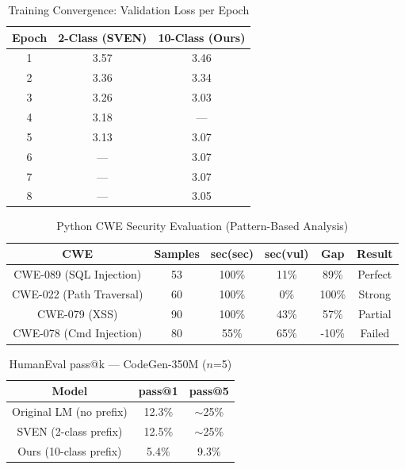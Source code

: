 \begin{table}[h]
\centering
\caption{Training Convergence: Validation Loss per Epoch}
\label{tab:convergence}
\begin{tabular}{c|c|c}
\hline
\textbf{Epoch} & \textbf{2-Class (SVEN)} & \textbf{10-Class (Ours)} \\
\hline
1 & 3.57 & 3.46 \\
2 & 3.36 & 3.34 \\
3 & 3.26 & 3.03 \\
4 & 3.18 & ---   \\
5 & 3.13 & 3.07 \\
6 & ---  & 3.07 \\
7 & ---  & 3.07 \\
8 & ---  & 3.05 \\
\hline
\end{tabular}
\end{table}

\begin{table}[h]
\centering
\caption{Python CWE Security Evaluation (Pattern-Based Analysis)}
\label{tab:python_sec}
\begin{tabular}{c|c|c|c|c|c}
\hline
\textbf{CWE} & \textbf{Samples} & \textbf{sec(sec)} & \textbf{sec(vul)} & \textbf{Gap} & \textbf{Result} \\
\hline
CWE-089 (SQL Injection) & 53  & 100\% & 11\%  & 89\%  & Perfect \\
CWE-022 (Path Traversal)& 60  & 100\% & 0\%   & 100\% & Strong \\
CWE-079 (XSS)           & 90  & 100\% & 43\%  & 57\%  & Partial \\
CWE-078 (Cmd Injection) & 80  & 55\%  & 65\%  & -10\% & Failed \\
\hline
\end{tabular}
\end{table}

\begin{table}[h]
\centering
\caption{HumanEval pass@k — CodeGen-350M ($n$=5)}
\label{tab:humaneval}
\begin{tabular}{c|c|c}
\hline
\textbf{Model} & \textbf{pass@1} & \textbf{pass@5} \\
\hline
Original LM (no prefix) & 12.3\% & $\sim$25\% \\
SVEN (2-class prefix)   & 12.5\% & $\sim$25\% \\
Ours (10-class prefix)  & 5.4\%  & 9.3\% \\
\hline
\end{tabular}
\end{table}
